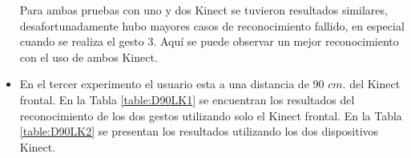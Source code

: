 \begin{itemize}
Para ambas pruebas con uno y dos Kinect se tuvieron resultados similares, desafortunadamente hubo mayores casos de reconocimiento fallido, en especial cuando se realiza el gesto 3. Aquí se puede observar un mejor reconocimiento con el uso de ambos Kinect.


\item En el tercer experimento el usuario esta a una distancia de $90$ $cm.$ del Kinect frontal. En la Tabla \ref{table:D90LK1} se encuentran los resultados del reconocimiento de los dos gestos utilizando solo el Kinect frontal. En la Tabla \ref{table:D90LK2} se presentan los resultados utilizando los dos dispositivos Kinect.    

%


\end{itemize}
